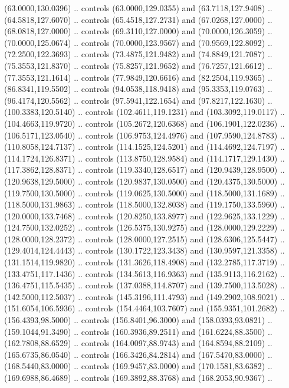   (63.0000,130.0396) .. controls (63.0000,129.0355) and (63.7118,127.9408) ..
  (64.5818,127.6070) .. controls (65.4518,127.2731) and (67.0268,127.0000) ..
  (68.0818,127.0000) .. controls (69.3110,127.0000) and (70.0000,126.3059) ..
  (70.0000,125.0674) .. controls (70.0000,123.9567) and (70.9569,122.8092) ..
  (72.2500,122.3693) .. controls (73.4875,121.9482) and (74.8849,121.7087) ..
  (75.3553,121.8370) .. controls (75.8257,121.9652) and (76.7257,121.6612) ..
  (77.3553,121.1614) .. controls (77.9849,120.6616) and (82.2504,119.9365) ..
  (86.8341,119.5502) .. controls (94.0538,118.9418) and (95.3353,119.0763) ..
  (96.4174,120.5562) .. controls (97.5941,122.1654) and (97.8217,122.1630) ..
  (100.3383,120.5140) .. controls (102.4611,119.1231) and (103.3092,119.0117) ..
  (104.4663,119.9720) .. controls (105.2672,120.6368) and (106.1901,122.0236) ..
  (106.5171,123.0540) .. controls (106.9753,124.4976) and (107.9590,124.8783) ..
  (110.8058,124.7137) .. controls (114.1525,124.5201) and (114.4692,124.7197) ..
  (114.1724,126.8371) .. controls (113.8750,128.9584) and (114.1717,129.1430) ..
  (117.3862,128.8371) .. controls (119.3340,128.6517) and (120.9439,128.9500) ..
  (120.9638,129.5000) .. controls (120.9837,130.0500) and (120.4375,130.5000) ..
  (119.7500,130.5000) .. controls (119.0625,130.5000) and (118.5000,131.1689) ..
  (118.5000,131.9863) .. controls (118.5000,132.8038) and (119.1750,133.5960) ..
  (120.0000,133.7468) .. controls (120.8250,133.8977) and (122.9625,133.1229) ..
  (124.7500,132.0252) .. controls (126.5375,130.9275) and (128.0000,129.2229) ..
  (128.0000,128.2372) .. controls (128.0000,127.2515) and (128.6306,125.5447) ..
  (129.4014,124.4443) .. controls (130.1722,123.3438) and (130.9597,121.3358) ..
  (131.1514,119.9820) .. controls (131.3626,118.4908) and (132.2785,117.3719) ..
  (133.4751,117.1436) .. controls (134.5613,116.9363) and (135.9113,116.2162) ..
  (136.4751,115.5435) .. controls (137.0388,114.8707) and (139.7500,113.5028) ..
  (142.5000,112.5037) .. controls (145.3196,111.4793) and (149.2902,108.9021) ..
  (151.6054,106.5936) .. controls (154.4464,103.7607) and (155.9351,101.2682) ..
  (156.4393,98.5000) .. controls (156.8401,96.3000) and (158.0393,93.0821) ..
  (159.1044,91.3490) .. controls (160.3936,89.2511) and (161.6224,88.3500) ..
  (162.7808,88.6529) .. controls (164.0097,88.9743) and (164.8594,88.2109) ..
  (165.6735,86.0540) .. controls (166.3426,84.2814) and (167.5470,83.0000) ..
  (168.5440,83.0000) .. controls (169.9457,83.0000) and (170.1581,83.6382) ..
  (169.6988,86.4689) .. controls (169.3892,88.3768) and (168.2053,90.9367) ..
